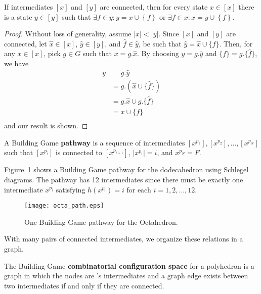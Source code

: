 \begin{mylem}
If intermediates $\left[x\right]$ and $\left[y\right]$ are connected, then for every state $x \in \left[x\right]$ there is a state $y \in \left[y\right]$ such that $\exists f \in y: y = x \cup \left\{f\right\}$ or $\exists f \in x: x = y \cup \left\{f\right\}$.
\end{mylem}
\begin{proof}
  Without loss of generality, assume $|x| < |y|$. Since $[x]$ and $[y]$ are connected, let $\hat{x} \in [x]$, $\hat{y} \in [y]$, and $\hat{f} \in \hat{y}$, be such that $\hat{y} = \hat{x}\cup\{\hat{f}\}$. Then, for any $x \in [x]$, pick $g \in G$ such that $x = g.\hat{x}$. By choosing $y = g.\hat{y}$ and $\{f\} = g.\{\hat{f}\}$, we have
\begin{align}
  y &= g.\hat{y} \\
  &= g.(\hat{x}\cup\{\hat{f}\}) \\
  &= g.\hat{x}\cup g.\{\hat{f}\} \\
  &= x \cup \{f\} \\
\end{align}    
and our result is shown.
\end{proof}


\begin{mydef}
A Building Game \textbf{pathway} is a sequence of intermediates $[x^{p_1}], [x^{p_2}], \dots, [x^{p_N}]$ such that  $[x^{p_i}]$ is connected to $[x^{p_{i+1}}]$, $|x^{p_i}| = i$, and $x^{p_N} = F$.
\end{mydef}

 Figure~\ref{fig:OctaPath} shows a Building Game pathway for the dodecahedron using Schlegel diagrams. The pathway has 12 intermediates since there must be exactly one intermediate $x^{p_i}$ satisfying $h\left(x^{p_i}\right) = i$ for each $i = 1,2,\dots,12$.

\begin{figure}[ht]
\texttt{[image: octa\_path.eps]}
\caption{One Building Game pathway for the Octahedron.}
\label{fig:OctaPath}
\end{figure}

With many pairs of connected intermediates, we organize these relations in a graph.

\begin{mydef}
The Building Game \textbf{combinatorial configuration space} for a polyhedron \poly\spc is a graph in which the nodes are \poly's intermediates and a graph edge exists between two intermediates if and only if they are connected. 
\end{mydef}

